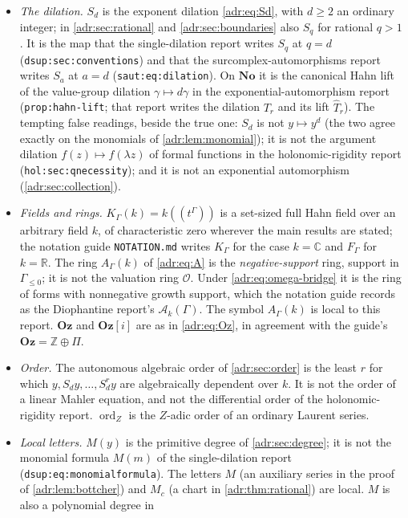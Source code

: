 \documentclass[11pt,letterpaper]{article}
\numberwithin{equation}{section}
\theoremstyle{definition}
\theoremstyle{remark}
\newcommand{\No}{\mathbf{No}}
\newcommand{\Oz}{\mathbf{Oz}}
\newcommand{\Goz}{\mathbf{Oz}[i]}
\newcommand{\C}{\mathbb C}
\newcommand{\R}{\mathbb R}
\newcommand{\Z}{\mathbb Z}
\newcommand{\A}{A_\Gamma(k)}
\newcommand{\K}{K_\Gamma(k)}
\newcommand{\ord}{\operatorname{ord}}
\newcommand{\rpath}[1]{\nolinkurl{#1}}%
\newcommand{\lbl}[1]{\nolinkurl{#1}}%
\begin{document}
\begin{itemize}[leftmargin=*,itemsep=3pt]
\item \emph{The dilation.} $S_d$ is the exponent dilation
\eqref{adr:eq:Sd}, with $d\ge2$ an ordinary integer; in
\cref{adr:sec:rational} and \cref{adr:sec:boundaries} also $S_q$ for
rational $q>1$. It is the map that the single-dilation report writes $S_q$
at $q=d$ (\lbl{dsup:sec:conventions}) and that the
surcomplex-automorphisms report writes $S_a$ at $a=d$
(\lbl{saut:eq:dilation}). On $\No$ it is the canonical Hahn lift
of the value-group dilation $\gamma\mapsto d\gamma$ in the
exponential-automorphism report (\lbl{prop:hahn-lift}; that report writes
the dilation $T_r$ and its lift $\widehat T_r$). The tempting false
readings, beside the true one: $S_d$ is not $y\mapsto y^d$ (the two agree
exactly on the monomials of \cref{adr:lem:monomial}); it is not the
argument dilation $f(z)\mapsto f(\lambda z)$ of formal functions in the
holonomic-rigidity report (\lbl{hol:sec:qnecessity}); and it is not an
exponential automorphism (\cref{adr:sec:collection}).
\item \emph{Fields and rings.} $\K=k((t^\Gamma))$ is a set-sized full Hahn
field over an arbitrary field $k$, of characteristic zero wherever the
main results are stated; the notation guide \rpath{NOTATION.md} writes
$K_\Gamma$ for the case $k=\C$ and $F_\Gamma$ for $k=\R$. The ring $\A$ of
\eqref{adr:eq:A} is the \emph{negative-support} ring, support in
$\Gamma_{\le0}$; it is not the valuation ring $\mathcal O$. Under
\eqref{adr:eq:omega-bridge} it is the ring of forms with nonnegative growth
support, which the notation guide records as the Diophantine report's
$\mathcal A_k(\Gamma)$. The symbol $\A$ is local to this report. $\Oz$ and
$\Goz$ are as in \eqref{adr:eq:Oz}, in agreement with the guide's
$\Oz=\Z\oplus\Pi$.
\item \emph{Order.} The autonomous algebraic order of \cref{adr:sec:order}
is the least $r$ for which $y,S_dy,\ldots,S_d^ry$ are algebraically
dependent over $k$. It is not the order of a linear Mahler equation, and
not the differential order of the holonomic-rigidity report. $\ord_Z$ is
the $Z$-adic order of an ordinary Laurent series.
\item \emph{Local letters.} $M(y)$ is the primitive degree of
\cref{adr:sec:degree}; it is not the monomial formula $M(m)$ of the
single-dilation report (\lbl{dsup:eq:monomialformula}). The letters $M$
(an auxiliary series in the proof of \cref{adr:lem:bottcher}) and $M_c$ (a
chart in \cref{adr:thm:rational}) are local. $M$ is also a polynomial degree in

\end{itemize}
\end{document}
